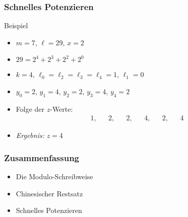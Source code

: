 \documentclass{beamer}
\renewcommand{\emph}[1]{{\textcolor{solarizedRed}{\itshape #1}}}
\begin{document}
\begin{frame}\frametitle{Schnelles Potenzieren}
	\begin{block}{Beispiel}
		\begin{itemize}
			\item $m=7$, $\ell=29$, $x=2$
			\item $29=2^4+2^3+2^2+2^0$
			\item $k=4$, $\ell_0=\ell_2=\ell_3=\ell_4=1$, $\ell_1=0$
			\item $y_0=2$, $y_1=4$, $y_2=2$, $y_3=4$, $y_4=2$ 
			\item Folge der $z$-Werte:
				\begin{align*}
					1,&&2,&&2,&&4,&&2,&&4
				\end{align*}
			\item \emph{Ergebnis:} $z=4$
		\end{itemize}
	\end{block}
\end{frame}

\begin{frame}\frametitle{Zusammenfassung}
	\begin{itemize}
		\item Die Modulo-Schreibweise
		\item Chinesischer Restsatz
		\item Schnelles Potenzieren
	\end{itemize}
\end{frame}
\end{document}
